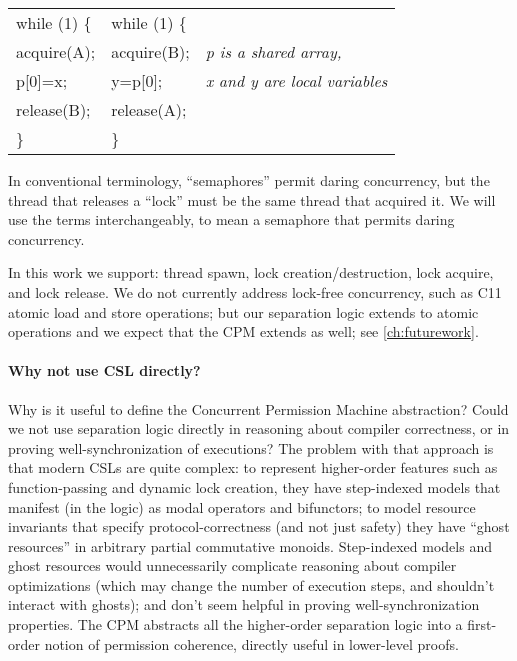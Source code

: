 \begin{tabular}{l@{\qquad\qquad}l@{\qquad\qquad\qquad}l}
    while (1) \{  & while (1) \{ \\
    \quad acquire(A); & \quad acquire(B); &  \emph{p is a shared array,}
 \\
    \quad p[0]=x;     & \quad y=p[0];   & \emph{x and y are local variables}  \\
    \quad release(B); & \quad release(A); \\
    \}            & \}            \\
  \end{tabular}

\noindent In conventional terminology,
``semaphores'' permit daring concurrency,
but the thread that releases a ``lock'' must be the same thread that acquired it.
We will use the terms interchangeably, to mean a semaphore that
permits daring concurrency.

In this work we support: thread spawn, lock creation/destruction, lock acquire, and
lock release. We do not currently address lock-free concurrency, such as C11
atomic load and store operations; but our
separation logic extends to atomic operations \cite{mailbox}
and we expect that the CPM
extends as well; see \autoref{ch:futurework}.

\paragraph{Why not use CSL directly?}
Why is it useful to define the Concurrent Permission Machine abstraction?
Could we not use separation logic directly in reasoning about
compiler correctness, or in proving well-synchronization of
executions?  The problem with that approach is that modern
CSLs are quite complex: to represent higher-order features such
as function-passing and dynamic lock creation, they have step-indexed
models that manifest (in the logic) as modal operators and bifunctors;
to model resource invariants that specify protocol-correctness
(and not just safety) they have ``ghost resources'' in
arbitrary partial commutative monoids.
Step-indexed models and ghost resources would unnecessarily
complicate reasoning about compiler optimizations (which may
change the number of execution steps, and shouldn't interact with ghosts);
and don't seem helpful in proving well-synchronization properties.
The CPM abstracts all the higher-order separation logic into
a first-order notion of permission coherence, directly useful in
lower-level proofs. 





%
%





